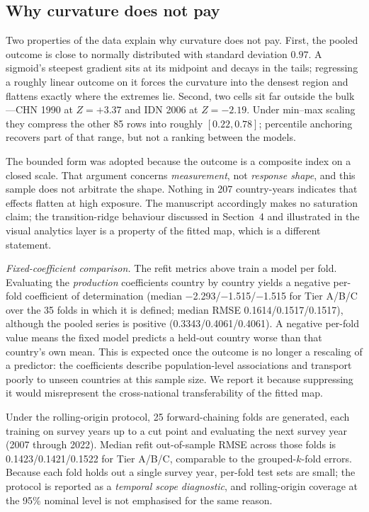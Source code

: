 \documentclass[11pt]{article}
\begin{document}
\subsection*{Why curvature does not pay}
Two properties of the data explain why curvature does not pay. First, the pooled outcome is close to normally distributed with standard deviation $0.97$. A sigmoid's steepest gradient sits at its midpoint and decays in the tails; regressing a roughly linear outcome on it forces the curvature into the densest region and flattens exactly where the extremes lie. Second, two cells sit far outside the bulk---CHN 1990 at $Z=+3.37$ and IDN 2006 at $Z=-2.19$. Under min--max scaling they compress the other 85 rows into roughly $[0.22, 0.78]$; percentile anchoring recovers part of that range, but not a ranking between the models.

The bounded form was adopted because the outcome is a composite index on a closed scale. That argument concerns \emph{measurement}, not \emph{response shape}, and this sample does not arbitrate the shape. Nothing in 207 country-years indicates that effects flatten at high exposure. The manuscript accordingly makes no saturation claim; the transition-ridge behaviour discussed in Section~4 and illustrated in the visual analytics layer is a property of the fitted map, which is a different statement.

\emph{Fixed-coefficient comparison.} The refit metrics above train a model per fold. Evaluating the \emph{production} coefficients country by country yields a negative per-fold coefficient of determination (median \num{-2.293}/\num{-1.515}/\num{-1.515} for Tier A/B/C over the 35 folds in which it is defined; median RMSE \num{0.1614}/\num{0.1517}/\num{0.1517}), although the pooled series is positive (\num{0.3343}/\num{0.4061}/\num{0.4061}). A negative per-fold value means the fixed model predicts a held-out country worse than that country's own mean. This is expected once the outcome is no longer a rescaling of a predictor: the coefficients describe population-level associations and transport poorly to unseen countries at this sample size. We report it because suppressing it would misrepresent the cross-national transferability of the fitted map.

Under the rolling-origin protocol, 25 forward-chaining folds are generated, each training on survey years up to a cut point and evaluating the next survey year (2007 through 2022). Median refit out-of-sample RMSE across those folds is \num{0.1423}/\num{0.1421}/\num{0.1522} for Tier A/B/C, comparable to the grouped-$k$-fold errors. Because each fold holds out a single survey year, per-fold test sets are small; the protocol is reported as a \emph{temporal scope diagnostic}, and rolling-origin coverage at the 95\% nominal level is not emphasised for the same reason.
\end{document}
